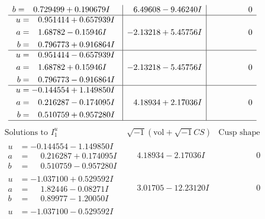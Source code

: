 \documentclass[1p]{elsarticle_modified}
\theoremstyle{definition}
\newcommand{\I}{\sqrt{-1}}
\begin{document}
$$\begin{array}{c|c|c}
\begin{aligned}
b &= \phantom{-}0.729499 + 0.190679 I\end{aligned}
 & \phantom{-}6.49608 - 9.46240 I & \phantom{-0.000000 } 0 \\ \hline\begin{aligned}
u &= \phantom{-}0.951414 + 0.657939 I \\
a &= \phantom{-}1.68782 - 0.15946 I \\
b &= \phantom{-}0.796773 + 0.916864 I\end{aligned}
 & -2.13218 + 5.45756 I & \phantom{-0.000000 } 0 \\ \hline\begin{aligned}
u &= \phantom{-}0.951414 - 0.657939 I \\
a &= \phantom{-}1.68782 + 0.15946 I \\
b &= \phantom{-}0.796773 - 0.916864 I\end{aligned}
 & -2.13218 - 5.45756 I & \phantom{-0.000000 } 0 \\ \hline\begin{aligned}
u &= -0.144554 + 1.149850 I \\
a &= \phantom{-}0.216287 - 0.174095 I \\
b &= \phantom{-}0.510759 + 0.957280 I\end{aligned}
 & \phantom{-}4.18934 + 2.17036 I & \phantom{-0.000000 } 0\\
 \hline 
 \end{array}$$\newpage$$\begin{array}{c|c|c}  
\text{Solutions to }I^u_{1}& \I (\text{vol} + \sqrt{-1}CS) & \text{Cusp shape}\\
 \hline 
\begin{aligned}
u &= -0.144554 - 1.149850 I \\
a &= \phantom{-}0.216287 + 0.174095 I \\
b &= \phantom{-}0.510759 - 0.957280 I\end{aligned}
 & \phantom{-}4.18934 - 2.17036 I & \phantom{-0.000000 } 0 \\ \hline\begin{aligned}
u &= -1.037100 + 0.529592 I \\
a &= \phantom{-}1.82446 - 0.08271 I \\
b &= \phantom{-}0.89977 - 1.20050 I\end{aligned}
 & \phantom{-}3.01705 - 12.23120 I & \phantom{-0.000000 } 0 \\ \hline\begin{aligned}
u &= -1.037100 - 0.529592 I \\

\end{aligned}
\end{array}$$
\end{document}
